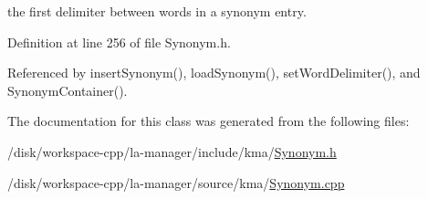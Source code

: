 the first delimiter between words in a synonym entry. 



Definition at line 256 of file Synonym.h.

Referenced by insertSynonym(), loadSynonym(), setWordDelimiter(), and SynonymContainer().

The documentation for this class was generated from the following files:\begin{CompactItemize}
\item 
/disk/workspace-cpp/la-manager/include/kma/\hyperlink{Synonym_8h}{Synonym.h}\item 
/disk/workspace-cpp/la-manager/source/kma/\hyperlink{Synonym_8cpp}{Synonym.cpp}\end{CompactItemize}
